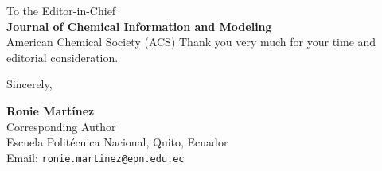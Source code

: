 \documentclass[11pt,a4paper]{letter}
\begin{document}
\begin{letter}{
To the Editor-in-Chief\\
\textbf{Journal of Chemical Information and Modeling}\\
American Chemical Society (ACS)
}
Thank you very much for your time and editorial consideration.

\closing{Sincerely,}

\vspace{0.5cm}
\textbf{Ronie Martínez}\\
Corresponding Author\\
Escuela Politécnica Nacional, Quito, Ecuador\\
Email: \texttt{ronie.martinez@epn.edu.ec}

\end{letter}
\end{document}
